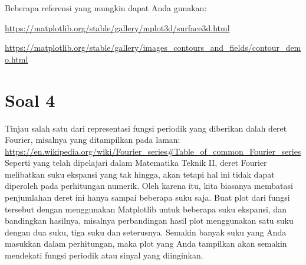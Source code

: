 Beberapa referensi yang mungkin dapat Anda gunakan:

{\footnotesize
  \url{https://matplotlib.org/stable/gallery/mplot3d/surface3d.html}
}

{\footnotesize
  \url{https://matplotlib.org/stable/gallery/images_contours_and_fields/contour_demo.html}
}

\section{Soal 4}
Tinjau salah satu dari representasi fungsi periodik yang diberikan dalah deret Fourier, misalnya
yang ditampilkan pada laman:
{\footnotesize
\url{https://en.wikipedia.org/wiki/Fourier_series#Table_of_common_Fourier_series}}
Seperti yang telah dipelajari dalam Matematika Teknik II, deret Fourier melibatkan
suku ekspansi yang tak hingga, akan tetapi hal ini tidak dapat diperoleh pada perhitungan
numerik. Oleh karena itu, kita biasanya membatasi penjumlahan deret ini hanya sampai beberapa
suku saja.
Buat plot dari fungsi tersebut dengan menggunakan Matplotlib untuk beberapa
suku ekspansi, dan bandingkan hasilnya, misalnya perbandingan hasil plot menggunakan satu suku
dengan dua suku, tiga suku dan seterusnya. Semakin banyak suku yang Anda masukkan
dalam perhitungan, maka plot yang Anda tampilkan akan semakin mendekati fungsi periodik atau sinyal
yang diinginkan.



